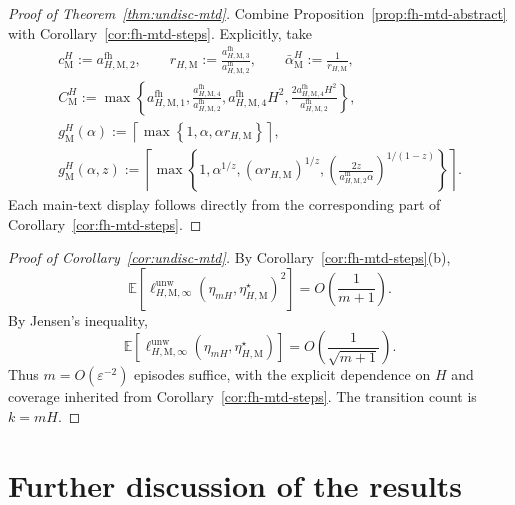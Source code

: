 \documentclass{article}
\begin{document}
\begin{proof}[Proof of Theorem~\ref{thm:undisc-mtd}]
Combine Proposition~\ref{prop:fh-mtd-abstract} with Corollary~\ref{cor:fh-mtd-steps}. Explicitly, take
\begin{equation}
\begin{gathered}
c_{\mathrm M}^H:=a_{H,\mathrm M,2}^{\mathrm{fh}},\qquad r_{H,\mathrm M}:=\frac{a_{H,\mathrm M,3}^{\mathrm{fh}}}{a_{H,\mathrm M,2}^{\mathrm{fh}}},\qquad \bar\alpha_{\mathrm M}^H:=\frac{1}{r_{H,\mathrm M}}, \\
C_{\mathrm M}^H:=\max\left\{a_{H,\mathrm M,1}^{\mathrm{fh}},\frac{a_{H,\mathrm M,4}^{\mathrm{fh}}}{a_{H,\mathrm M,2}^{\mathrm{fh}}},a_{H,\mathrm M,4}^{\mathrm{fh}}H^2,\frac{2a_{H,\mathrm M,4}^{\mathrm{fh}}H^2}{a_{H,\mathrm M,2}^{\mathrm{fh}}}\right\}, \\
g_{\mathrm M}^H(\alpha):=\left\lceil\max\left\{1,\alpha,\alpha r_{H,\mathrm M}\right\}\right\rceil, \\
g_{\mathrm M}^H(\alpha,z):=\left\lceil\max\left\{1,\alpha^{1/z},(\alpha r_{H,\mathrm M})^{1/z},\left(\frac{2z}{a_{H,\mathrm M,2}^{\mathrm{fh}}\alpha}\right)^{1/(1-z)}\right\}\right\rceil.
\end{gathered}
\end{equation}
Each main-text display follows directly from the corresponding part of Corollary~\ref{cor:fh-mtd-steps}.
\end{proof}

\begin{proof}[Proof of Corollary~\ref{cor:undisc-mtd}]
By Corollary~\ref{cor:fh-mtd-steps}\textup{(b)},
\begin{equation}
\mathbb E\left[ \ell_{H,\mathrm M,\infty}^{\mathrm{unw}}(\eta_{mH},\eta_{H,\mathrm M}^\star)^2 \right] = O\left(\frac{1}{m+1}\right).
\end{equation}
By Jensen's inequality,
\begin{equation}
\mathbb E\left[ \ell_{H,\mathrm M,\infty}^{\mathrm{unw}}(\eta_{mH},\eta_{H,\mathrm M}^\star) \right] = O\left(\frac{1}{\sqrt{m+1}}\right).
\end{equation}
Thus $m = O(\varepsilon^{-2})$ episodes suffice, with the explicit dependence on $H$ and coverage inherited from Corollary~\ref{cor:fh-mtd-steps}. The transition count is $k=mH$.
\end{proof}

\section{Further discussion of the results}\label{app:discus}
\end{document}
